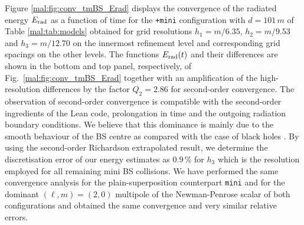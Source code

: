 Figure \ref{mal:fig:conv_tmBS_Erad} displays the convergence
of the radiated energy $E_{\rm rad}$ as a function
of time for the {\tt +mini} configuration with $d=101\,m$ of
Table \ref{mal:tab:models} obtained for grid resolutions
$h_1=m/6.35$, $h_2=m/9.53$ and $h_3=m/12.70$ on the
innermost refinement level and corresponding grid
spacings on the other levels. The functions
$E_{\rm rad}(t)$ and their differences are shown in the
bottom and top panel, respectively, of Fig.~\ref{mal:fig:conv_tmBS_Erad}
together with an amplification of the high-resolution
differences by the factor $Q_2=2.86$ for second-order
convergence. The observation of second-order convergence
is compatible with the second-order ingredients of the
{\sc Lean} code, prolongation in time and the outgoing
radiation boundary conditions. We believe that this
dominance is mainly due to the smooth behaviour
of the BS centre as compared with the case of black holes
\cite{Husa:2007hp}. By using the second-order
Richardson extrapolated result, we determine the
discretisation error of our energy estimates as
$0.9\,\%$ for $h_3$ which is the resolution employed
for all remaining mini BS collisions. We have performed
the same convergence analysis for the plain-superposition
counterpart {\tt mini} and for the dominant $(\ell,m)=(2,0)$
multipole of the Newman-Penrose scalar of both configurations
and obtained the same convergence and very similar relative
errors.
%
%

